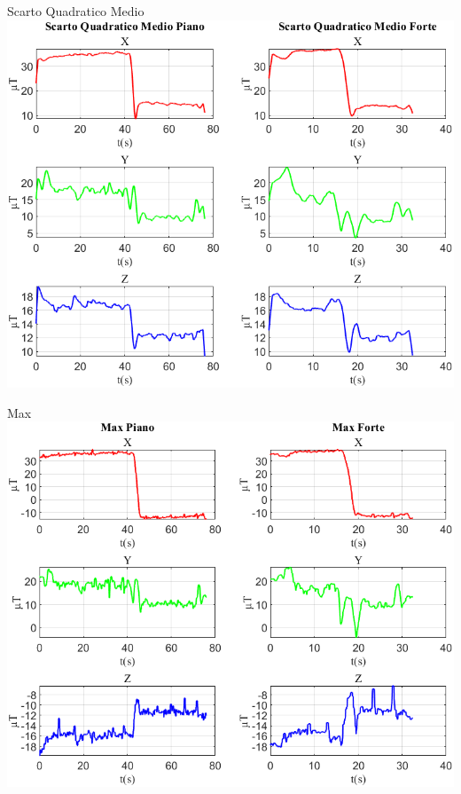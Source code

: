 	\begin{frame}{{Scarto Quadratico Medio}}
		\centering\includegraphics[height=.8\textheight]{figure/Mag/Scarto Quadratico Medio}
	\end{frame}
	
	\begin{frame}{{Max}}
		\centering\includegraphics[height=.8\textheight]{figure/Mag/Max}
	\end{frame}
	
